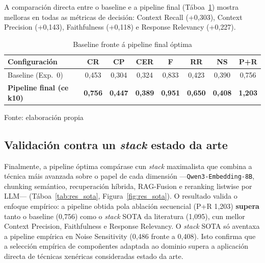 \documentclass[11pt, a4paper, oneside]{report}
\newcommand{\fonte}[1]{%
  \par\smallskip
  {\centering\fontsize{9}{11}\selectfont Fonte: #1\par}}
\begin{document}
A comparación directa entre o baseline e a pipeline final (Táboa~\ref{tab:res_final})
mostra melloras en todas as métricas de decisión: Context Recall (+0{,}303), Context
Precision (+0{,}143), Faithfulness (+0{,}118) e Response Relevancy (+0{,}227).

\begin{table}[H]
  \centering
  \caption{Baseline fronte á pipeline final óptima}
  \label{tab:res_final}
  \footnotesize
  \begin{tabular}{lccccccc}
    \toprule
    \textbf{Configuración} & \textbf{CR} & \textbf{CP} & \textbf{CER} & \textbf{F}
                           & \textbf{RR} & \textbf{NS} & \textbf{P+R} \\
    \midrule
    Baseline (Exp.~0)              & 0,453 & 0,304 & 0,324 & 0,833 & 0,423 & 0,390 & 0,756 \\
    \textbf{Pipeline final (ce k10)} & \textbf{0,756} & \textbf{0,447} & \textbf{0,389} & \textbf{0,951} & \textbf{0,650} & \textbf{0,408} & \textbf{1,203} \\
    \bottomrule
  \end{tabular}
  \fonte{elaboración propia}
\end{table}

\subsection{Validación contra un \textit{stack} estado da arte}
\label{sec:res_sota}

Finalmente, a pipeline óptima compárase cun \textit{stack} maximalista que combina a
técnica máis avanzada sobre o papel de cada dimensión —\texttt{Qwen3-Embedding-8B},
chunking semántico, recuperación híbrida, RAG-Fusion e reranking listwise por LLM—
(Táboa~\ref{tab:res_sota}, Figura~\ref{fig:res_sota}). O resultado valida o enfoque
empírico: a pipeline obtida pola
ablación secuencial (P+R 1{,}203) \textbf{supera} tanto o baseline (0{,}756) como o
\textit{stack} SOTA da literatura (1{,}095), cun mellor Context Precision, Faithfulness e
Response Relevancy. O \textit{stack} SOTA só aventaxa a pipeline empírica en Noise
Sensitivity (0{,}486 fronte a 0{,}408). Isto confirma que a selección empírica de
compoñentes adaptada ao dominio supera a aplicación directa de técnicas xenéricas
consideradas estado da arte.
\end{document}
